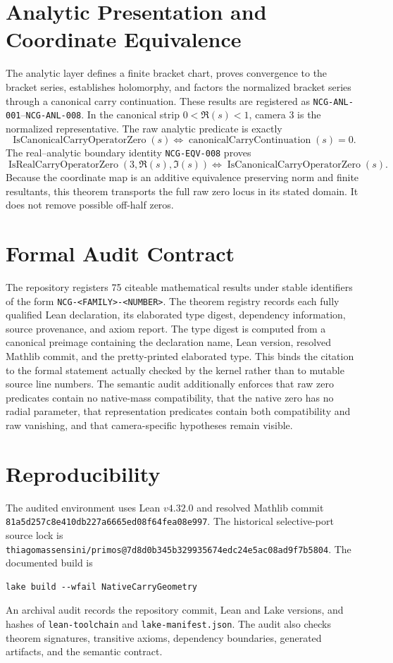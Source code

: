\documentclass[11pt,a4paper]{article}
\begin{document}
\section{Analytic Presentation and Coordinate Equivalence}
The analytic layer defines a finite bracket chart, proves convergence to the bracket series, establishes holomorphy, and factors the normalized bracket series through a canonical carry continuation. These results are registered as \texttt{NCG-ANL-001}--\texttt{NCG-ANL-008}.
In the canonical strip $0<\Re(s)<1$, camera $3$ is the normalized representative. The raw analytic predicate is exactly
\[ \operatorname{IsCanonicalCarryOperatorZero}(s)\Longleftrightarrow \operatorname{canonicalCarryContinuation}(s)=0. \]
The real--analytic boundary identity \texttt{NCG-EQV-008} proves
\[ \operatorname{IsRealCarryOperatorZero}(3,\Re(s),\Im(s))\Longleftrightarrow \operatorname{IsCanonicalCarryOperatorZero}(s). \]
Because the coordinate map is an additive equivalence preserving norm and finite resultants, this theorem transports the full raw zero locus in its stated domain. It does not remove possible off-half zeros.
\section{Formal Audit Contract}
The repository registers 75 citeable mathematical results under stable identifiers of the form \texttt{NCG-<FAMILY>-<NUMBER>}. The theorem registry records each fully qualified Lean declaration, its elaborated type digest, dependency information, source provenance, and axiom report.
The type digest is computed from a canonical preimage containing the declaration name, Lean version, resolved Mathlib commit, and the pretty-printed elaborated type. This binds the citation to the formal statement actually checked by the kernel rather than to mutable source line numbers.
The semantic audit additionally enforces that raw zero predicates contain no native-mass compatibility, that the native zero has no radial parameter, that representation predicates contain both compatibility and raw vanishing, and that camera-specific hypotheses remain visible.
\section{Reproducibility}
The audited environment uses Lean $v4.32.0$ and resolved Mathlib commit \texttt{81a5d257c8e410db227a6665ed08f64fea08e997}. The historical selective-port source lock is \texttt{thiagomassensini/primos@7d8d0b345b329935674edc24e5ac08ad9f7b5804}. The documented build is
\begin{verbatim}
lake build --wfail NativeCarryGeometry
\end{verbatim}
An archival audit records the repository commit, Lean and Lake versions, and hashes of \texttt{lean-toolchain} and \texttt{lake-manifest.json}. The audit also checks theorem signatures, transitive axioms, dependency boundaries, generated artifacts, and the semantic contract.
\end{document}
